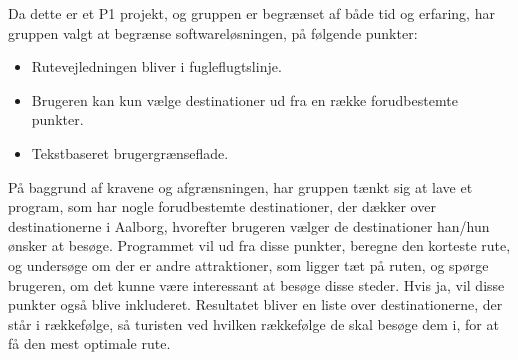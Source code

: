 Da dette er et P1 projekt, og gruppen er begrænset af både tid og erfaring, har gruppen valgt at begrænse softwareløsningen, på følgende punkter: 
\begin{itemize}
	\item Rutevejledningen bliver i fugleflugtslinje.
	\item Brugeren kan kun vælge destinationer ud fra en række forudbestemte punkter.
	\item Tekstbaseret brugergrænseflade.
\end{itemize}

På baggrund af kravene og afgrænsningen, har gruppen tænkt sig at lave et program, som har nogle forudbestemte destinationer, der dækker over destinationerne i Aalborg, hvorefter brugeren vælger de destinationer han/hun ønsker at besøge. Programmet vil ud fra disse punkter, beregne den korteste rute, og undersøge om der er andre attraktioner, som ligger tæt på ruten, og spørge brugeren, om det kunne være interessant at besøge disse steder. Hvis ja, vil disse punkter også blive inkluderet. Resultatet bliver en liste over destinationerne, der står i rækkefølge, så turisten ved hvilken rækkefølge de skal besøge dem i, for at få den mest optimale rute.
